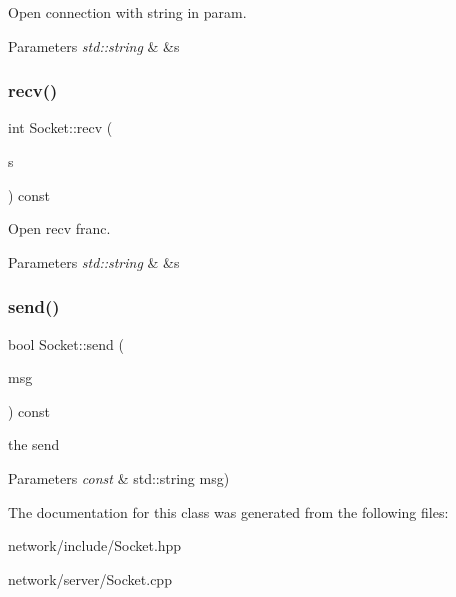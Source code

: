 Open connection with string in param. 


\begin{DoxyParams}{Parameters}
{\em std\+::string} & \&s \\
\hline
\end{DoxyParams}
\mbox{\label{class_socket_aba586befe39d7c3f48ef1ea8c777be53}} 
\subsubsection{\texorpdfstring{recv()}{recv()}}
{\footnotesize\ttfamily int Socket\+::recv (\begin{DoxyParamCaption}\item[{std\+::string \&}]{s }\end{DoxyParamCaption}) const}



Open recv franc. 


\begin{DoxyParams}{Parameters}
{\em std\+::string} & \&s \\
\hline
\end{DoxyParams}
\mbox{\label{class_socket_a26f80b1f9440bc48f0df6e9dd0a20c03}} 
\subsubsection{\texorpdfstring{send()}{send()}}
{\footnotesize\ttfamily bool Socket\+::send (\begin{DoxyParamCaption}\item[{const std\+::string}]{msg }\end{DoxyParamCaption}) const}



the send 


\begin{DoxyParams}{Parameters}
{\em const} & std\+::string msg) \\
\hline
\end{DoxyParams}


The documentation for this class was generated from the following files\+:\begin{DoxyCompactItemize}
\item 
network/include/Socket.\+hpp\item 
network/server/Socket.\+cpp\end{DoxyCompactItemize}
